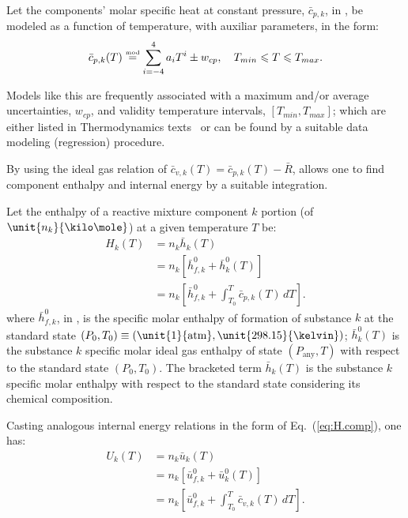    Let the components' molar specific heat at constant pressure, $\bar{c}_{p,k}$, in \kilo\joule\per\kilo\mole\usk\kelvin, be modeled as a function of temperature, with  auxiliar  parameters,
    in the form:%
    \begin{equation}
        \bar{c}_{p,k}(T) \stackrel{\text{{\tiny mod}}}{=} \sum_{i=-4}^4 a_iT^i \pm w_{cp}, \quad T_{min} \leqslant T \leqslant T_{max}.
        \label{eq:cp}
    \end{equation}

    Models like this are frequently associated with a maximum and/or average uncertainties, $w_{cp}$, and validity temperature intervals, $[T_{min},  T_{max}]$;  which  are  either  listed  in
    Thermodynamics texts~\cite{2014-CengelYA+BolesMA-McGrawHill, 1985-WylenG-Wiley} or can be found by a suitable data modeling (regression) procedure.

    By using the ideal gas relation of $\bar{c}_{v,k}(T) = \bar{c}_{p,k}(T) - \bar{R}$, allows one to find component enthalpy and internal energy by a suitable integration.

    Let the enthalpy of a reactive mixture component $k$ portion (of $\unit{n_k}{\kilo\mole}$) at a given temperature $T$ be:%
    \begin{align}
        H_k(T)      &= n_k\bar{h}_k(T) \nonumber\\
                    &= n_k[\bar{h}^0_{f,k} + \bar{h}^0_k(T)] \nonumber\\
                    &= n_k\left[
                        \bar{h}^0_{f,k} + \int_{T_0}^T \bar{c}_{p,k}(T)\,dT
                    \right].
        \label{eq:H.comp}
    \end{align}
    \noindent  where  $\bar{h}^0_{f,k}$,  in  \kilo\joule\per\kilo\mole,  is  the  specific  molar  enthalpy  of  formation  of  substance  $k$  at  the  standard  state  $(P_0,  T_0)   \equiv
    (\unit{1}{\mathrm{atm}}, \unit{298.15}{\kelvin})$; $\bar{h}^0_k(T)$ is the substance $k$ specific molar ideal gas enthalpy of state $(P_{\mathrm{any}}, T)$ with  respect  to  the  standard
    state $(P_0, T_0)$. The bracketed term $\bar{h}_k(T)$ is the substance $k$ specific molar enthalpy with respect to the standard state considering its chemical composition.

    Casting analogous internal energy relations in the form of Eq.~(\ref{eq:H.comp}), one has:%
    \begin{align}
        U_k(T)      &= n_k\bar{u}_k(T) \nonumber\\
                    &= n_k[\bar{u}^0_{f,k} + \bar{u}^0_k(T)] \nonumber\\
                    &= n_k\left[
                        \bar{u}^0_{f,k} + \int_{T_0}^T \bar{c}_{v,k}(T)\,dT
                    \right].
        \label{eq:U.comp}
    \end{align}

